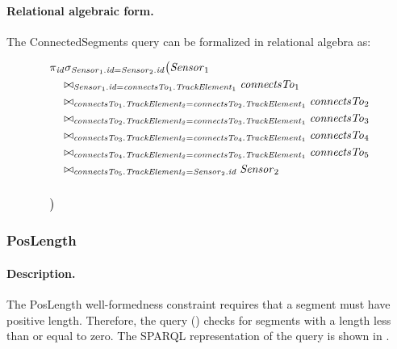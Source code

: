 \paragraph{Relational algebraic form.} The \textsf{ConnectedSegments} query can be formalized in relational algebra as:

\begin{align*}
& \pi_{\mathit{id}} \sigma_{\mathit{Sensor}_1.\mathit{id} = \mathit{Sensor}_2.\mathit{id}} \big( \mathit{Sensor}_1 \\
& \quad \bowtie_{\mathit{Sensor}_1.\mathit{id} = \mathit{connectsTo}_1.\mathit{TrackElement}_1} \mathit{connectsTo}_1 \\
& \quad \bowtie_{\mathit{connectsTo}_1.\mathit{TrackElement_2} = \mathit{connectsTo}_2.\mathit{TrackElement}_1} \mathit{connectsTo}_2 \\
& \quad \bowtie_{\mathit{connectsTo}_2.\mathit{TrackElement_2} = \mathit{connectsTo}_3.\mathit{TrackElement}_1} \mathit{connectsTo}_3 \\
& \quad \bowtie_{\mathit{connectsTo}_3.\mathit{TrackElement_2} = \mathit{connectsTo}_4.\mathit{TrackElement}_1} \mathit{connectsTo}_4 \\
& \quad \bowtie_{\mathit{connectsTo}_4.\mathit{TrackElement_2} = \mathit{connectsTo}_5.\mathit{TrackElement}_1} \mathit{connectsTo}_5 \\
& \quad \bowtie_{\mathit{connectsTo}_5.\mathit{TrackElement_2} = \mathit{Sensor}_2.\mathit{id}} \mathit{Sensor}_2 \\
& \quad \\
& \big)
\end{align*}


\subsubsection{PosLength}

\paragraph{Description.} The \textsf{PosLength} well-formedness constraint requires that a segment must have positive length. Therefore, the query () checks for segments with a length less than or equal to zero. The SPARQL representation of the query is shown in .

